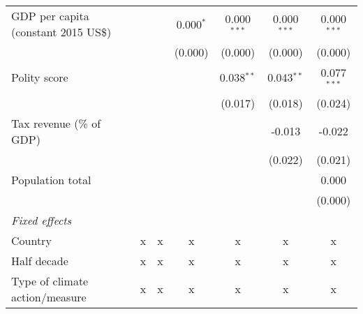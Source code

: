 \begin{tabular}{lcccccc}
   GDP per capita (constant 2015 US\$)                                                                &         &                & 0.000$^{*}$    & 0.000$^{***}$  & 0.000$^{***}$  & 0.000$^{***}$\\   
                                                                                                      &         &                & (0.000)        & (0.000)        & (0.000)        & (0.000)\\   
   Polity score                                                                                       &         &                &                & 0.038$^{**}$   & 0.043$^{**}$   & 0.077$^{***}$\\   
                                                                                                      &         &                &                & (0.017)        & (0.018)        & (0.024)\\   
   Tax revenue (\% of GDP)                                                                            &         &                &                &                & -0.013         & -0.022\\   
                                                                                                      &         &                &                &                & (0.022)        & (0.021)\\   
   Population total                                                                                   &         &                &                &                &                & 0.000\\   
                                                                                                      &         &                &                &                &                & (0.000)\\   
   \emph{Fixed effects}\\
   Country                                                                                            & x       & x              & x              & x              & x              & x\\  
   Half decade                                                                                        & x       & x              & x              & x              & x              & x\\  
   Type of climate action/measure                                                                     & x       & x              & x              & x              & x              & x\\  

\end{tabular}
